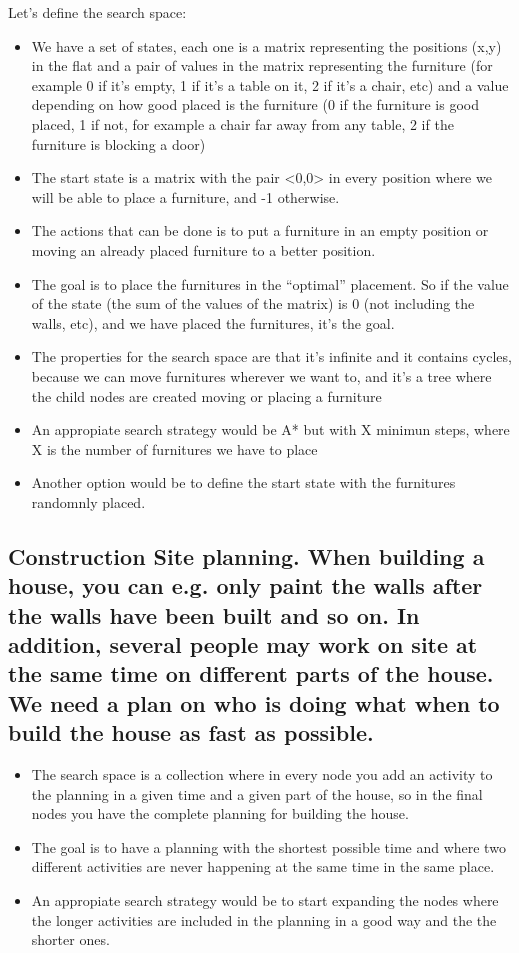 \documentclass[paper=a4, fontsize=11pt]{scrartcl} %
\numberwithin{equation}{section} %
\numberwithin{figure}{section} %
\numberwithin{table}{section} %
\begin{document}
Let's define the search space:

\begin{itemize}
	\item We have a set of states, each one is a matrix representing the positions (x,y)  in the flat and a pair of values in the matrix representing the furniture (for example 0 if it's empty, 1 if it's a table on it, 2 if it's a chair, etc) and a value depending on how good placed is the furniture (0 if the furniture is good placed, 1 if not, for example a chair far away from any table, 2 if the furniture is blocking a door)
	\item The start state is a matrix with the pair <0,0> in every position where we will be able to place a furniture, and -1 otherwise.
	\item The actions that can be done is to put a furniture in an empty position or moving an already placed furniture to a better position.
	\item The goal is to place the furnitures in the “optimal” placement. So if the value of the state (the sum of the values of the matrix) is 0 (not including the walls, etc), and we have placed the furnitures, it's the goal.
	\item The properties for the search space are that it's infinite and it contains cycles, because we can move furnitures wherever we want to, and it's a tree where the child nodes are created moving or placing a furniture
	\item An appropiate search strategy would be A* but with X minimun steps, where X is the number of furnitures we have to place
	\item Another option would be to define the start state with the furnitures randomnly placed.
\end{itemize}


\subsection{Construction Site planning. When building a house, you can e.g. only paint the walls after the walls have been built and so on. In addition, several people may work on site at the same time on different parts of the house. We need a plan on who is doing what when to build the house as fast as possible.}

\begin{itemize}
	\item The search space is a collection where in every node you add an activity to the planning in a given time and a given part of the house, so in the final nodes you have the complete planning for building the house.
	\item The goal is to have a planning with the shortest possible time and where two different activities are never happening at the same time in the same place.
	\item An appropiate search strategy would be to start expanding the nodes where the longer activities are included in the planning in a good way and the the shorter ones.
\end{itemize}
\end{document}
